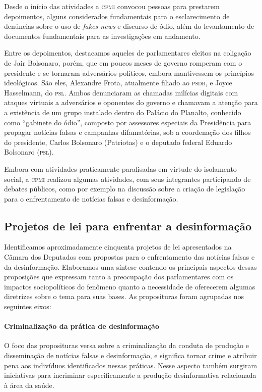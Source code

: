 Desde o início das atividades a \textsc{cpmi} convocou pessoas para prestarem
depoimentos, alguns considerados fundamentais para o esclarecimento de
denúncias sobre o uso de \textit{fakes news} e discurso de ódio, além do
levantamento de documentos fundamentais para as investigações em
andamento.

Entre os depoimentos, destacamos aqueles de parlamentares eleitos na
coligação de Jair Bolsonaro, porém, que em poucos meses de governo
romperam com o presidente e se tornaram adversários políticos, embora
mantivessem os princípios ideológicos. São eles, Alexandre Frota,
atualmente filiado ao \textsc{psdb}, e Joyce Hasselmann, do \textsc{psl}. %
Ambos denunciaram as chamadas milícias digitais com ataques virtuais a 
adversários e oponentes do
governo e chamavam a atenção para a existência de um grupo instalado
dentro do Palácio do Planalto, conhecido como ``gabinete do ódio'',
composto por assessores especiais da Presidência para propagar notícias
falsas e campanhas difamatórias, sob a coordenação dos filhos do
presidente, Carlos Bolsonaro (Patriotas) e o deputado federal Eduardo
Bolsonaro (\textsc{psl}).

Embora com atividades praticamente paralisadas em virtude do isolamento
social, a \textsc{cpmi} realizou algumas atividades, com seus integrantes
participando de debates públicos, como por exemplo na discussão sobre a 
criação de legislação para o enfrentamento de notícias falsas e desinformação.

\subsection{Projetos de lei para enfrentar a desinformação}

Identificamos aproximadamente cinquenta projetos de lei apresentados na
Câmara dos Deputados com propostas para o enfrentamento das notícias
falsas e da desinformação. Elaboramos uma síntese contendo os principais
aspectos dessas proposições que expressam tanto a preocupação dos
parlamentares com os impactos sociopolíticos do fenômeno quanto a
necessidade de oferecerem algumas diretrizes sobre o tema para suas
bases. As proposituras foram agrupadas nos seguintes eixos:

\paragraph{Criminalização da prática de desinformação} O foco das proposituras versa sobre a criminalização da conduta de
produção e disseminação de notícias falsas e desinformação, e significa
tornar crime e atribuir pena aos indivíduos identificados nessas
práticas. Nesse aspecto também surgiram iniciativas para incriminar
especificamente a produção desinformativa relacionada à área da saúde.

